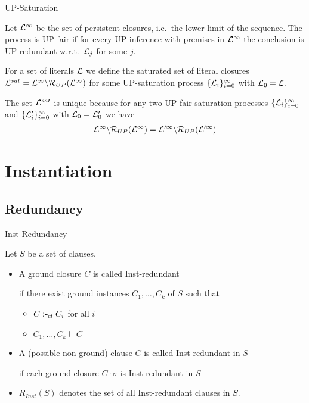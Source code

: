 \documentclass[%
handout,
]{beamer}
\begin{document}
\begin{frame}[allowframebreaks]{UP-Saturation}
    \begin{definition}
        Let \( \mathcal{L}^\infty \) be the set of persistent closures,
        i.e.~the lower limit of the sequence.
        The process is {UP-fair} if for every UP-inference
        with premises in \( \mathcal{L}^\infty \) the conclusion is UP-redundant
        w.r.t.~\(\mathcal{L}_j\) for some \(j\).

        For a set of literals \( \mathcal{L} \) we define
        the saturated set of literal closures
        \( \mathcal{L}^{sat} = \mathcal{L}^\infty\backslash\mathcal{R}_{UP}(\mathcal{L}^\infty) \)
        for some UP-saturation process
        \( \{ \mathcal{L}_i\}_{i=0}^\infty \)
        with $\mathcal{L}_0 = \mathcal{L}$.
    \end{definition}

    \begin{lemma}
        The set \( \mathcal{L}^{sat} \) is unique because
        for any two UP-fair saturation processes
        \(\{ \mathcal{L}_i
            \}_{i=0}^\infty\) and
            \(\{ \mathcal{L}'_i
            \}_{i=0}^\infty\)
            with $\mathcal{L}_0 = \mathcal{L}'_0$ we have
            \begin{gather*}
                \mathcal{L}^\infty \backslash \mathcal{R}_{UP}(\mathcal{L}^\infty)
                =
                \mathcal{L}'^\infty \backslash \mathcal{R}_{UP}(\mathcal{L}'^\infty)
            \end{gather*}
    \end{lemma}
\end{frame}

\section{Instantiation}
\subsection{Redundancy}

\begin{frame}{Inst-Redundancy}

Let $S$ be a set of clauses.

\begin{itemize}
    \item A ground closure $C$ is called Inst-redundant

    if there exist ground instances $C_1,\ldots,C_k$ of $S$ such that
    \begin{itemize}
        \item $C\mathrel\succ_{\!cl} C_i$ for all $i$
        \item $C_1,\ldots,C_k\models C$
    \end{itemize}
    \vspace{0.7em}
    \item 
    A (possible non-ground) clause $C$ is called Inst-redundant in $S$

if each ground closure $C\cdot\sigma$ is Inst-redundant in $S$

\vspace{0.7em}
\item
$R_{Inst}(S)$ denotes the set of all Inst-redundant clauses in $S$.

\end{itemize}
\end{frame}
\end{document}

